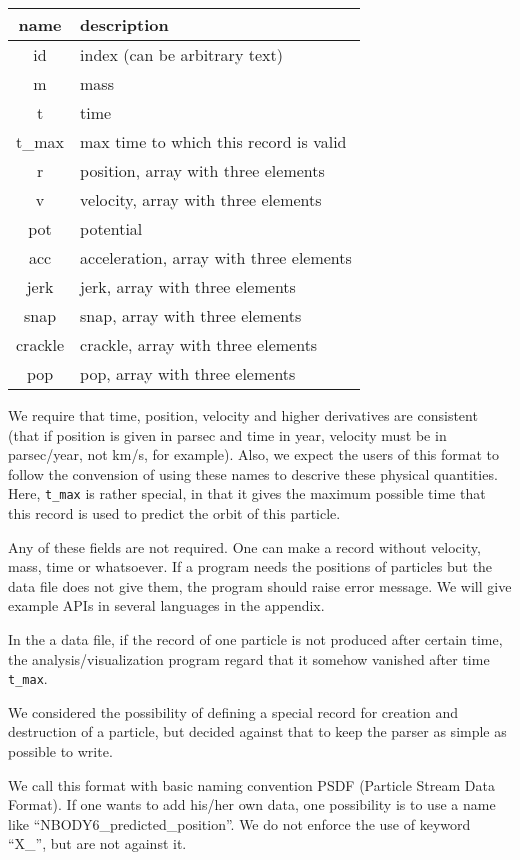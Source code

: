 \documentclass{elsart5p}
\begin{document}
\begin{center}
\begin{tabular}{|c|l|}
\hline
name & description\\
\hline
id & index (can be arbitrary text)\\
m & mass\\
t & time\\
t\_max & max time to which this record is valid \\
r  & position, array with three elements\\
v  & velocity, array with three elements\\
pot  & potential\\
acc  & acceleration, array with three elements\\
jerk  & jerk, array with three elements\\
snap  & snap, array with three elements\\
crackle  & crackle, array with three elements\\
pop  & pop, array with three elements\\
\hline
\end{tabular}
\end{center}

We require that time, position, velocity and higher derivatives are
consistent (that if position is given in parsec and time in year,
velocity must be in parsec/year, not km/s, for example). Also, we
expect the users of this format to follow the convension of using
these names to descrive these physical quantities. Here, {\tt t\_max}
is rather special, in that it gives the maximum possible time that
this record is used to predict the orbit of this particle.

Any of these fields are not required. One can make a record without
velocity, mass, time or whatsoever. If a program needs the positions
of particles but the data file does not give them, the program should
raise error message. We will give example APIs in several languages in
the appendix.

In the a data file, if the record of one particle is not produced
after certain time, the analysis/visualization program regard that it
somehow vanished after time {\tt t\_max}.

We considered the possibility of defining a special record for
creation and destruction of a particle, but decided against that to
keep the parser as simple as possible to write.

We call this format with basic naming convention PSDF (Particle Stream
Data Format). If one wants to add his/her own data, one possibility is
to use a name like ``NBODY6\_predicted\_position''. We do not enforce
the use of keyword  ``X\_'', but are not against it.
\end{document}
